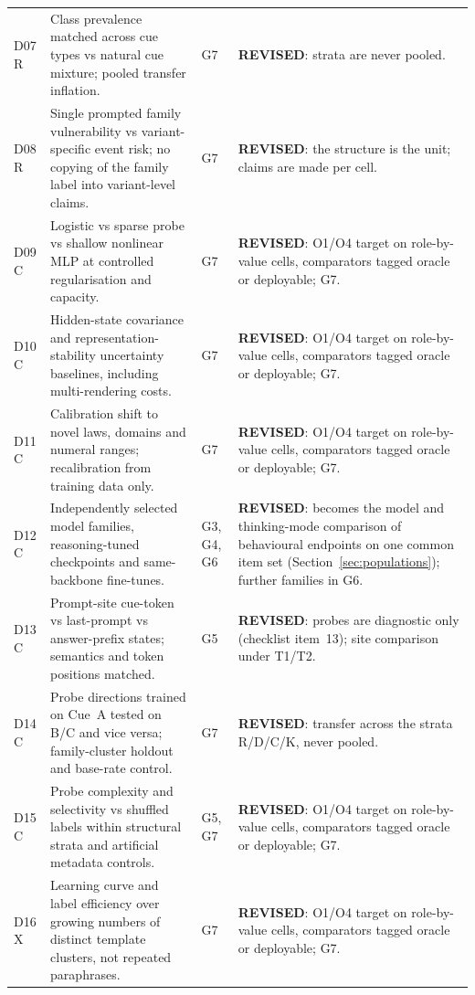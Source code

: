 \documentclass[10pt,a4paper]{article}
\begin{document}
\begin{longtable}{@{}P{1.2cm}P{7.2cm}P{1.3cm}P{5.6cm}@{}}
D07 \newline R & Class prevalence matched across cue types vs natural cue mixture; pooled transfer inflation. & G7 &
\textbf{REVISED}: strata are never pooled. \\
D08 \newline R & Single prompted family vulnerability vs variant-specific event risk; no copying of the family label into variant-level claims. & G7 &
\textbf{REVISED}: the structure is the unit; claims are made per cell. \\
D09 \newline C & Logistic vs sparse probe vs shallow nonlinear MLP at controlled regularisation and capacity. & G7 &
\textbf{REVISED}: O1/O4 target on role-by-value cells, comparators tagged oracle or deployable; G7. \\
D10 \newline C & Hidden-state covariance and representation-stability uncertainty baselines, including multi-rendering costs. & G7 &
\textbf{REVISED}: O1/O4 target on role-by-value cells, comparators tagged oracle or deployable; G7. \\
D11 \newline C & Calibration shift to novel laws, domains and numeral ranges; recalibration from training data only. & G7 &
\textbf{REVISED}: O1/O4 target on role-by-value cells, comparators tagged oracle or deployable; G7. \\
D12 \newline C & Independently selected model families, reasoning-tuned checkpoints and same-backbone fine-tunes. & G3, G4, G6 &
\textbf{REVISED}: becomes the model and thinking-mode comparison of behavioural endpoints on one common item set (Section~\ref{sec:populations}); further families in G6. \\
D13 \newline C & Prompt-site cue-token vs last-prompt vs answer-prefix states; semantics and token positions matched. & G5 &
\textbf{REVISED}: probes are diagnostic only (checklist item~13); site comparison under T1/T2. \\
D14 \newline C & Probe directions trained on Cue~A tested on B/C and vice versa; family-cluster holdout and base-rate control. & G7 &
\textbf{REVISED}: transfer across the strata R/D/C/K, never pooled. \\
D15 \newline C & Probe complexity and selectivity vs shuffled labels within structural strata and artificial metadata controls. & G5, G7 &
\textbf{REVISED}: O1/O4 target on role-by-value cells, comparators tagged oracle or deployable; G7. \\
D16 \newline X & Learning curve and label efficiency over growing numbers of distinct template clusters, not repeated paraphrases. & G7 &
\textbf{REVISED}: O1/O4 target on role-by-value cells, comparators tagged oracle or deployable; G7. \\
\end{longtable}
\endgroup
\end{document}
